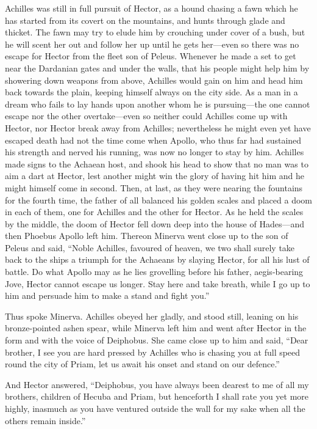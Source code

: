 Achilles was still in full pursuit of Hector, as a hound chasing a fawn
which he has started from its covert on the mountains, and hunts through
glade and thicket. The fawn may try to elude him by crouching under cover
of a bush, but he will scent her out and follow her up until he gets her—even
so there was no escape for Hector from the fleet son of Peleus. Whenever
he made a set to get near the Dardanian gates and under the walls, that
his people might help him by showering down weapons from above, Achilles
would gain on him and head him back towards the plain, keeping himself
always on the city side. As a man in a dream who fails to lay hands upon
another whom he is pursuing—the one cannot escape nor the other
overtake—even so neither could Achilles come up with Hector, nor
Hector break away from Achilles; nevertheless he might even yet have
escaped death had not the time come when Apollo, who thus far had
sustained his strength and nerved his running, was now no longer to stay
by him. Achilles made signs to the Achaean host, and shook his head to
show that no man was to aim a dart at Hector, lest another might win the
glory of having hit him and he might himself come in second. Then, at
last, as they were nearing the fountains for the fourth time, the father
of all balanced his golden scales and placed a doom in each of them, one
for Achilles and the other for Hector. As he held the scales by the
middle, the doom of Hector fell down deep into the house of Hades—and
then Phoebus Apollo left him. Thereon Minerva went close up to the son of
Peleus and said, “Noble Achilles, favoured of heaven, we two shall surely
take back to the ships a triumph for the Achaeans by slaying Hector, for
all his lust of battle. Do what Apollo may as he lies grovelling before
his father, aegis-bearing Jove, Hector cannot escape us longer. Stay here
and take breath, while I go up to him and persuade him to make a stand and
fight you.”

Thus spoke Minerva. Achilles obeyed her gladly, and stood still, leaning
on his bronze-pointed ashen spear, while Minerva left him and went after
Hector in the form and with the voice of Deiphobus. She came close up to
him and said, “Dear brother, I see you are hard pressed by Achilles who is
chasing you at full speed round the city of Priam, let us await his onset
and stand on our defence.”

And Hector answered, “Deiphobus, you have always been dearest to me of all
my brothers, children of Hecuba and Priam, but henceforth I shall rate you
yet more highly, inasmuch as you have ventured outside the wall for my
sake when all the others remain inside.”

